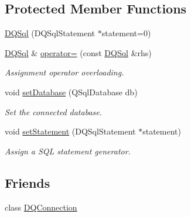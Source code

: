 \subsection*{Protected Member Functions}
\begin{DoxyCompactItemize}
\item 
\hyperlink{classDQSql_a4cf50ec3f96dcee4571a5045533e2f08}{DQSql} (DQSqlStatement $\ast$statement=0)
\item 
\hypertarget{classDQSql_aef87956547a14627a5198c1ff4dec101}{
\hyperlink{classDQSql}{DQSql} \& \hyperlink{classDQSql_aef87956547a14627a5198c1ff4dec101}{operator=} (const \hyperlink{classDQSql}{DQSql} \&rhs)}
\label{classDQSql_aef87956547a14627a5198c1ff4dec101}

\begin{DoxyCompactList}\small\item\em Assignment operator overloading. \item\end{DoxyCompactList}\item 
\hypertarget{classDQSql_ac0ee242993455e44fdac4d5cefe784bd}{
void \hyperlink{classDQSql_ac0ee242993455e44fdac4d5cefe784bd}{setDatabase} (QSqlDatabase db)}
\label{classDQSql_ac0ee242993455e44fdac4d5cefe784bd}

\begin{DoxyCompactList}\small\item\em Set the connected database. \item\end{DoxyCompactList}\item 
void \hyperlink{classDQSql_a0865d62f39a13d243eabf00a6713899a}{setStatement} (DQSqlStatement $\ast$statement)
\begin{DoxyCompactList}\small\item\em Assign a SQL statement generator. \item\end{DoxyCompactList}\end{DoxyCompactItemize}
\subsection*{Friends}
\begin{DoxyCompactItemize}
\item 
\hypertarget{classDQSql_a61c775c69c6581646215b987bc193808}{
class \hyperlink{classDQSql_a61c775c69c6581646215b987bc193808}{DQConnection}}
\label{classDQSql_a61c775c69c6581646215b987bc193808}

\end{DoxyCompactItemize}


